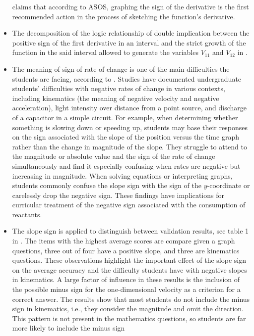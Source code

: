 \documentclass[11pt]{book}
\begin{document}
\begin{itemize}
claims that according to ASOS, graphing the sign of the derivative
is the first recommended action in the process of sketching the function's
derivative.
\item The decomposition of the logic relationship of double implication
between the positive sign of the first derivative in an interval and
the strict growth of the function in the said interval allowed to
generate the variables $V_{11}$ and $V_{12}$ in \cite{fuentealba2018understanding}.
\item The meaning of sign of rate of change is one of the main difficulties
the students are facing, according to \cite{seethaler2018analyzing}.
Studies have documented undergraduate students' difficulties with
negative rates of change in various contexts, including kinematics
(the meaning of negative velocity and negative acceleration), light
intensity over distance from a point source, and discharge of a capacitor
in a simple circuit. For example, when determining whether something
is slowing down or speeding up, students may base their responses
on the sign associated with the slope of the position versus the time
graph rather than the change in magnitude of the slope. They struggle
to attend to the magnitude or absolute value and the sign of the rate
of change simultaneously and find it especially confusing when rates
are negative but increasing in magnitude. When solving equations or
interpreting graphs, students commonly confuse the slope sign with
the sign of the $y$-coordinate or carelessly drop the negative sign.
These findings have implications for curricular treatment of the negative
sign associated with the consumption of reactants.
\item The slope sign is applied to distinguish between validation results,
see table 1 in \cite{ceuppens20199th}.
The items with the highest average scores are \textquotedbl compare
given a graph\textquotedbl{} questions, three out of four have a positive
slope, and three are kinematics questions. These observations highlight
the important effect of the slope sign on the average accuracy and
the difficulty students have with negative slopes in kinematics. A
large factor of influence in these results is the inclusion of the
possible minus sign for the one-dimensional velocity as a criterion
for a correct answer. The results show that most students do not include
the minus sign in kinematics, i.e., they consider the magnitude and
omit the direction. This pattern is not present in the mathematics
questions, so students are far more likely to include the minus sign

\end{itemize}
\end{document}
